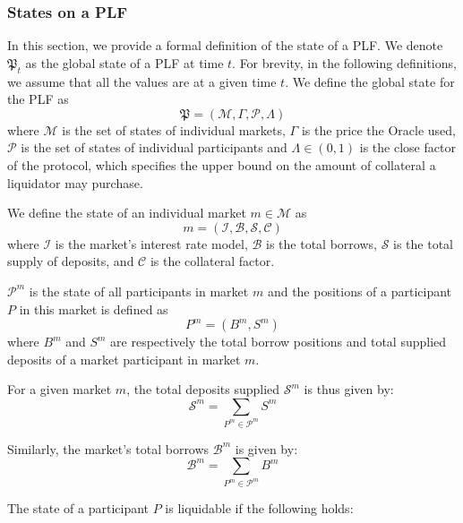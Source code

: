 \subsubsection{States on a PLF}
In this section, we provide a formal definition of the state of a PLF.
We denote $\mathfrak{P}_t$ as the global state of a PLF at time $t$.
For brevity, in the following definitions, we assume that all the values are at a given time $t$.
We define the global state for the PLF as
\[
  \mathfrak{P} = (\mathcal{M},\Gamma, \mathcal{P}, \Lambda)
\]
where $\mathcal{M}$ is the set of states of individual markets, $\Gamma$ is the price the Oracle used, $\mathcal{P}$ is the set of states of individual participants and $\Lambda \in (0, 1)$ is the close factor of the protocol, which specifies the upper bound on the amount of collateral a liquidator may purchase.

We define the state of an individual market
$m \in \mathcal{M}$ as 
$$m = (\mathcal{I}, \mathcal{B}, \mathcal{S}, \mathcal{C})$$
where
$\mathcal{I}$ is the market's interest rate model,
$\mathcal{B}$ is the total borrows,
$\mathcal{S}$ is the total supply of deposits,
and $\mathcal{C}$ is the collateral factor.

$\mathcal{P}^m$ is the state of all participants in market $m$ and the positions of a participant $P$ in this market is defined as
\[
  P^m = (B^m,S^m)
\]
where $B^m$ and $S^m$ are respectively the total borrow positions and total supplied deposits of a market participant in market $m$.

For a given market $m$, the total deposits supplied $\mathcal{S}^m$ is thus given by:
\begin{equation}
    \mathcal{S}^m = \sum_{P^m\in \mathcal{P}^m} S^m
\end{equation}

Similarly, the market's total borrows $\mathcal{B}^m$ is given by:
\begin{equation}
    \mathcal{B}^m = \sum_{P^m\in \mathcal{P}^m} B^m
\end{equation}

The state of a participant $P$ is liquidable if the following holds: 

